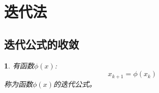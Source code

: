 \medskip


\section{迭代法}
\newtheorem{convergence_of_iterative_formula}{\theo}[section]
\newtheorem{deviation_of_iterative_formula}[convergence_of_iterative_formula]{\theo}
\newtheorem{theorem_of_local_convergence}[convergence_of_iterative_formula]{\theo}
\newtheorem{theorem_of_iterative_convergence_order}[convergence_of_iterative_formula]{\theo}
\newtheorem{iterative_formula}{}[section]
\newtheorem{local_convergence}[iterative_formula]{}
\newtheorem{iterative_convergence_order}[iterative_formula]{}

\subsection{迭代公式的收敛}

\begin{iterative_formula}
    \label{definition:iterative_formula}
    有函数$\phi(x)$:
    \begin{equation}
        x_{k+1} = \phi(x_k)
    \end{equation}
    称为函数$\phi(x)$的迭代公式。
\end{iterative_formula}

\medskip

\begin{iterative_algorithm}[一般迭代法]
    \label{algorithm:iterative_algorithm}
    \hfill\break{}
\end{iterative_algorithm}

\medskip

